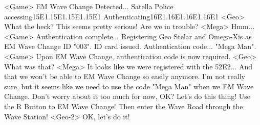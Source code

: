 <Game> EM Wave Change Detected... 
Satella Police accessing{15}{E1}.{15}{E1}.{15}{E1}.{15}{E1} Authenticating{16}{E1}.{16}{E1}.{16}{E1}.{16}{E1} 
<Geo> What the heck? 
This seems pretty serious! Are we in trouble? 
<Mega> Hmm... 
<Game> Authentication complete... 
Registering Geo Stelar and Omega-Xis as  EM Wave Change ID "003". 
ID card issued. Authentication code... 
"Mega Man". 
<Game> Upon EM Wave Change, authentication code is now required. 
<Geo> What was that? 
<Mega> It looks like we were registered with the {52}{E2}... 
And that we won't be able to EM Wave Change so easily anymore. 
I'm not really sure, but it seems like we need to  
use the code "Mega Man" when we EM Wave Change. 
Don't worry about it too much for now, OK? 
Let's do this thing! Use the R Button to EM Wave Change! 
Then enter the Wave Road through the Wave Station! 
<Geo-2> OK, let's do it! 
